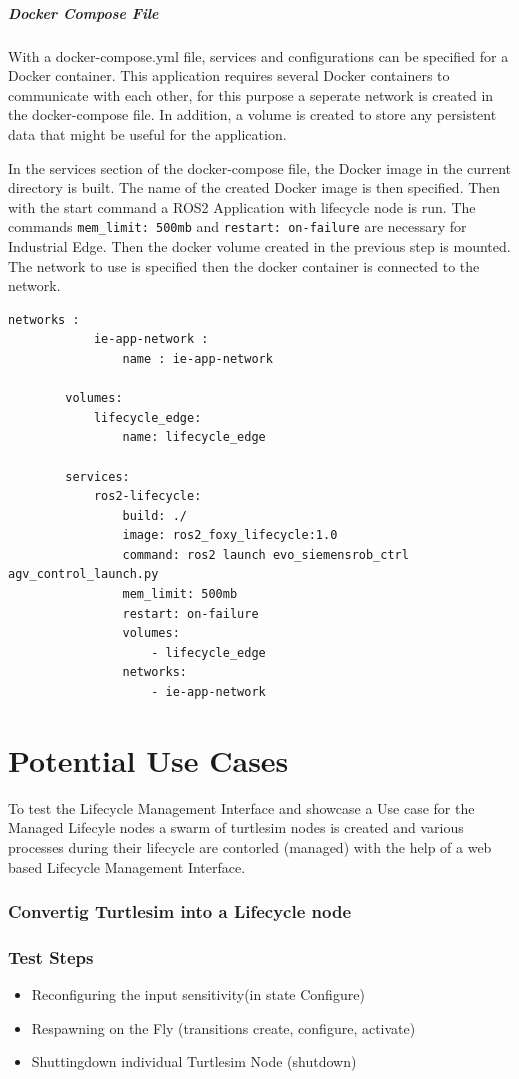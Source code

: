 \paragraph{Docker Compose File}
With a docker-compose.yml file, services and configurations can be specified for a Docker container. This application requires several Docker containers to communicate with each other, for this purpose a seperate network is created in the docker-compose file. In addition, a volume is created to store any persistent data that might be useful for the application.

In the services section of the docker-compose file, the Docker image in the current directory is built. The name of the created Docker image is then specified. Then with the start command a \gls{ROS2} Application with lifecycle node is run. The commands \lstinline{mem_limit: 500mb} and \lstinline{restart: on-failure} are necessary for Industrial Edge. Then the docker volume created in the previous step is mounted. The network to use is specified then the docker container is connected to the network.
\begin{lstlisting}[language=docker-compose,
		caption={docker-compose.yaml used by IE Publisher},
		label={Implementation:dockerCompose}]
		networks :
 			ie-app-network :
	 			name : ie-app-network

		volumes:
			lifecycle_edge:
				name: lifecycle_edge
		
		services:
			ros2-lifecycle:
				build: ./
				image: ros2_foxy_lifecycle:1.0
				command: ros2 launch evo_siemensrob_ctrl agv_control_launch.py 
				mem_limit: 500mb
				restart: on-failure
				volumes:
					- lifecycle_edge
				networks:
					- ie-app-network		
\end{lstlisting}

		
	
\chapter{Potential Use Cases}	

To test the Lifecycle Management Interface and showcase a Use case for the Managed Lifecyle nodes a swarm of turtlesim nodes is created and various processes during their lifecycle are contorled (managed) with the help of a web based Lifecycle Management Interface. 
\subsection{Convertig Turtlesim into a Lifecycle node}

\subsection{Test Steps}
\begin{itemize}
	\item Reconfiguring the input sensitivity(in state Configure)
	\item Respawning on the Fly (transitions create, configure, activate)
	\item Shuttingdown individual Turtlesim Node (shutdown)
\end{itemize}